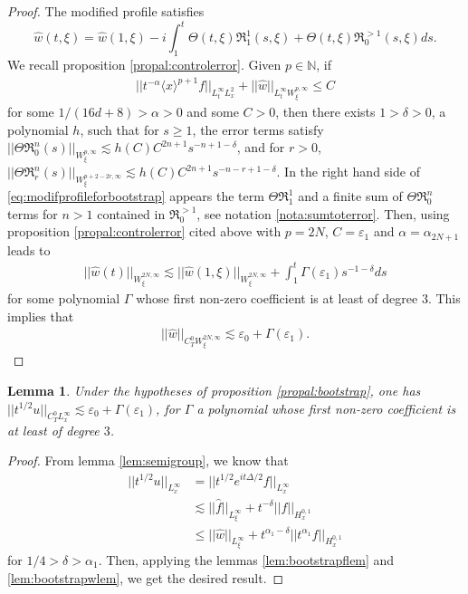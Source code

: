\documentclass[a4paper, 15pt]{article}
\numberwithin{equation}{section}
\newtheorem{lem}[defi]{Lemma}
\begin{document}
\begin{proof}
The modified profile satisfies 
\begin{equation}
\label{eq:modifprofileforbootstrap}
  \hat{w}(t,\xi)=\hat{w}(1,\xi)-i\int^t_1\Theta(t,\xi)\mathfrak{R}^1_{1}(s,\xi)+\Theta(t,\xi)\mathfrak{R}^{>1}_0(s,\xi)ds.
\end{equation}
We recall proposition \ref{propal:controlerror}. Given $p\in\mathbb{N}$, if 
\begin{align*}
||t^{-\alpha}\langle x\rangle^{p+1} f||_{L^\infty_tL^2_x}+||\hat{w}||_{L^\infty_tW^{p,\infty}_\xi}\leq C
\end{align*}
for some $1/(16d+8)>\alpha>0$ and some $C>0$, then there exists $1>\delta>0$, a polynomial $h$, such that for $s\geq 1$, the error terms satisfy $||\Theta\mathfrak{R}^n_0(s)||_{W^{p,\infty}_\xi}\lesssim h(C)C^{2n+1}s^{-n+1-\delta}$, and for $r>0$, $||\Theta\mathfrak{R}^n_r(s)||_{W^{p+2-2r,\infty}_\xi}\lesssim h(C)C^{2n+1}s^{-n-r+1-\delta}$. In the right hand side of \eqref{eq:modifprofileforbootstrap} appears the term $\Theta\mathfrak{R}^1_1$ and a finite sum of $\Theta\mathfrak{R}^n_0$ terms for $n>1$ contained in $\mathfrak{R}^{>1}_0$, see notation \ref{nota:sumtoterror}. Then, using proposition \ref{propal:controlerror} cited above with $p=2N$, $C=\varepsilon_1$ and $\alpha=\alpha_{2N+1}$ leads to
\begin{align*}
  ||\hat{w}(t)||_{W^{2N,\infty}_\xi}\lesssim||\hat{w}(1,\xi)||_{W^{2N,\infty}_\xi}+\int^t_1\Gamma(\varepsilon_1)s^{-1-\delta}ds
\end{align*}
for some polynomial $\Gamma$ whose first non-zero coefficient is at least of degree $3$. This implies that
\begin{align*}
  ||\hat{w}||_{C^0_TW^{2N,\infty}_\xi}\lesssim \varepsilon_0+\Gamma(\varepsilon_1).
\end{align*}
\end{proof}
\begin{lem}
Under the hypotheses of proposition \ref{propal:bootstrap}, one has 
$||t^{1/2}u||_{C^0_TL^\infty_x}\lesssim \varepsilon_0 +\Gamma(\varepsilon_1)$,
for $\Gamma$ a polynomial whose first non-zero coefficient is at least of degree $3$. 
\end{lem}
\begin{proof}
From lemma \ref{lem:semigroup}, we know that
\begin{align*}
||t^{1/2}u||_{L^\infty_x}&=||t^{1/2}e^{it\Delta/2}f||_{L^\infty_x}\\
&\lesssim ||\hat{f}||_{L^\infty_\xi}+t^{-\delta}||f||_{H^{0,1}_x}\\
&\leq ||\hat{w}||_{L^\infty_\xi}+t^{\alpha_1-\delta}||t^{\alpha_1}f||_{H^{0,1}_x}
\end{align*}
for $1/4>\delta>\alpha_1$. Then, applying the lemmas \ref{lem:bootstrapflem} and \ref{lem:bootstrapwlem}, we get the desired result. 
\end{proof}
\end{document}
